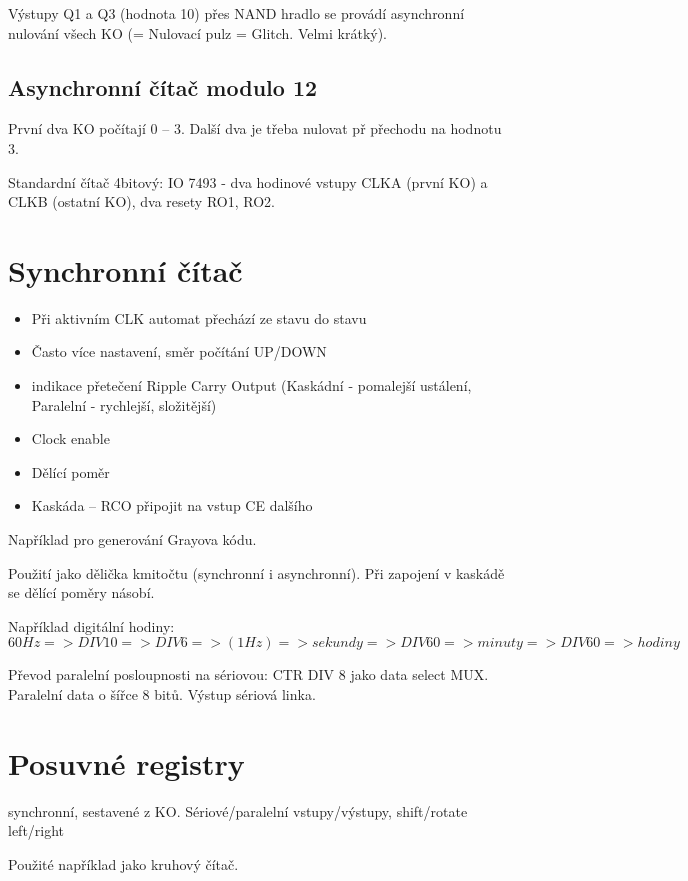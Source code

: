 \documentclass[a4wide]{report}
\begin{document}
Výstupy Q1 a Q3 (hodnota 10) přes NAND hradlo se provádí asynchronní nulování všech KO (= Nulovací pulz = Glitch. Velmi krátký).

\subsection{Asynchronní čítač modulo 12}

První dva KO počítají 0 -- 3. Další dva je třeba nulovat př přechodu na hodnotu 3.

Standardní čítač 4bitový: IO 7493 - dva hodinové vstupy CLKA (první KO) a CLKB (ostatní KO), dva resety RO1, RO2.

\section{Synchronní čítač}

\begin{itemize}
	\item Při aktivním CLK automat přechází ze stavu do stavu
	\item Často více nastavení, směr počítání UP/DOWN
	\item indikace přetečení Ripple Carry Output (Kaskádní - pomalejší ustálení, Paralelní - rychlejší, složitější)
	\item Clock enable
	\item Dělící poměr
	\item Kaskáda -- RCO připojit na vstup CE dalšího
\end{itemize}

Například pro generování Grayova kódu.

Použití jako dělička kmitočtu (synchronní i asynchronní). Při zapojení v kaskádě se dělící poměry násobí.

Například digitální hodiny: $60Hz => DIV 10 => DIV 6 => (1 Hz) => sekundy => DIV 60 => minuty => DIV 60 => hodiny$

Převod paralelní posloupnosti na sériovou: CTR DIV 8 jako data select MUX. Paralelní data o šířce 8 bitů. Výstup sériová linka.

\section{Posuvné registry}

synchronní, sestavené z KO. Sériové/paralelní vstupy/výstupy, shift/rotate left/right

Použité například jako kruhový čítač.
\end{document}
